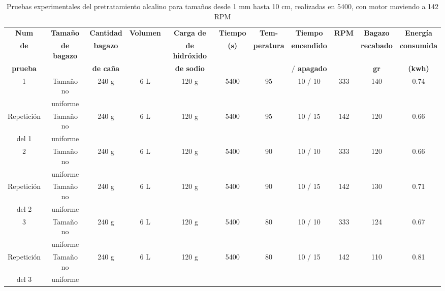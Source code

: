 \documentclass[12pt]{article}
\begin{document}
	
	 	\begin{table}[H]
	 	\centering
	 	\caption{Pruebas experimentales del pretratamiento alcalino para tamaños desde 1 mm hasta 10 cm, realizadas en 5400, con motor moviendo a 142 RPM}
	 	\label{pruebas 5400}
	 	\resizebox{16cm}{!} {
	 		\begin{tabular}{|c|c|c|c|c|c|c|c|c|c|c| }
	 			\hline
	 			\textbf{Num} & \textbf{Tamaño } & \textbf{Cantidad } & \textbf{Volumen} & \textbf{Carga de} & \textbf{Tiempo} & \textbf{Tem-} & \textbf{Tiempo} &\textbf{RPM} &   \textbf{Bagazo} & \textbf{Energía} \\
	 			\textbf{de}& \textbf{ de bagazo} & \textbf{ bagazo} & & \textbf{de hidróxido} & \textbf{(s)} & \textbf{peratura}&  \textbf{ encendido}& &  \textbf{recabado} &\textbf{consumida}  \\
	 			
	 			\textbf{prueba}	& &  \textbf{ de caña} & &\textbf{de sodio}  &  &  &\textbf{$/$ apagado} & & \textbf{gr} & \textbf{(kwh)}\\
	 			
	 			
	 			\hline
	 			1      & Tamaño no & 240 g & 6 L & 120 g & 5400 & 95 & 10 / 10 &333 &  140 &0.74 \\
	 		   	       & uniforme&       &     &       &      &    &         &   	&      &\\	\hline
	 			
	 			
	 	  	Repetición & Tamaño no& 240 g & 6 L & 120 g & 5400 & 95 & 10 / 15 & 142 & 120  & 0.66\\
	 			  del 1& uniforme &       &     &       &      &    &         &     &  & \\	\hline
	 			
	 		  	     2 & Tamaño no & 240 g & 6 L & 120 g & 5400 & 90 & 10 / 10 &333 & 120 &0.66 \\
	 	    	       & uniforme &     	&     &       &      &    &         &    &   &\\	\hline
	 	   	Repetición & Tamaño no & 240 g & 6 L & 120 g & 5400 & 90 & 10 / 15 &142  & 130  & 0.71\\
	 	        del 2  & uniforme &      &     &       &      &    &         &  &     & \\	\hline

	 			
	 		         3 & Tamaño no & 240 g & 6 L & 120 g & 5400 & 80 & 10 / 10 &333& 124   &0.67\\
	 		           & uniforme&       &     &       &      &    &         &    &   &\\	\hline
	 			
	 	   	Repetición & Tamaño no & 240 g & 6 L & 120 g & 5400 & 80 & 10 / 15 &142&110    &0.81 \\
	 	        del 3  & uniforme &      &     &       &      &    &         & &      & \\	\hline

	 			
	
	 			\hline
	 		\end{tabular}
	 	}
	 	
	 \end{table}
	
\end{document}
